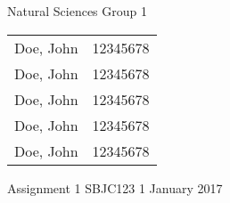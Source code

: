 \documentclass[11pt,a4paper]{article}
\begin{document}
\AddToShipoutPicture*{\nwuswoosh}

				{Natural Sciences}
				{Group 1}
				{
					\begin{tabular}{cc}
					Doe, John & 12345678 \\ 
					Doe, John & 12345678 \\ 
					Doe, John & 12345678 \\ 
					Doe, John & 12345678 \\  
					Doe, John & 12345678 \\ 
				\end{tabular} 
				}
				{Assignment 1}
				{SBJC123}
				{1 January 2017}
				
				
\end{document}
